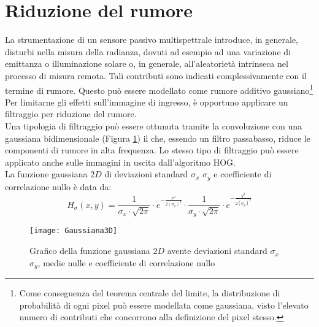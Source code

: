 
\section{Riduzione del rumore}

La strumentazione di un sensore passivo multispettrale introduce, in generale, disturbi nella misura della radianza, dovuti ad esempio ad una variazione di emittanza o illuminazione solare o, in generale, all'aleatorietà intrinseca nel processo di misura remota. Tali contributi sono indicati complessivamente con il termine di rumore. 
Questo può essere modellato come rumore additivo gaussiano\footnote{Come conseguenza del teorema centrale del limite, la distribuzione di probabilità di ogni pixel può essere modellata come gaussiana, visto l'elevato numero di contributi che concorrono alla definizione del pixel stesso.}
Per limitarne gli effetti sull'immagine di ingresso, è opportuno applicare un filtraggio per riduzione del rumore.\\

Una tipologia di filtraggio può essere ottunuta tramite la convoluzione con una gaussiana bidimensionale (Figura \ref{fig:Gaussiana3D}) il che, essendo un filtro passabasso, riduce le componenti di rumore in alta frequenza.
Lo stesso tipo di filtraggio può essere applicato anche sulle immagini in uscita dall'algoritmo HOG.\\


La funzione gaussiana $2D$ di deviazioni standard $\sigma_{x}$ $\sigma_{y}$ e coefficiente di correlazione nullo è data da:
\begin{equation}
\label{eq:Gaussiana_continua}
H_{\sigma}(x,y)= \frac{1}{\sigma_{x}\cdot \sqrt{2\pi}}\cdot e^{-\frac{x^{2}}{2(\sigma_{x})^{2}}}\cdot\frac{1}{\sigma_{y}\cdot \sqrt{2\pi}}\cdot e^{-\frac{y^{2}}{2(\sigma_{y})^{2}}}
\end{equation}

\begin{figure}[!ht]
\texttt{[image: Gaussiana3D]}
\caption{Grafico della funzione gaussiana $2D$ avente deviazioni standard $\sigma_{x}$ $\sigma_{y}$, medie nulle e coefficiente di correlazione nullo}
\label{fig:Gaussiana3D}
\end{figure}

